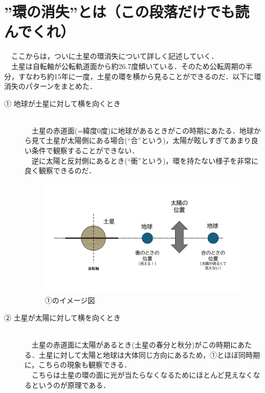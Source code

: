 \documentclass[../main]{subfiles}
\begin{document}
\newpage

\section{”環の消失”とは（この段落だけでも読んでくれ）}
　ここからは，ついに土星の環消失について詳しく記述していく．\\
　土星は自転軸が公転軌道面から約26.7度傾いている．そのため公転周期の半分，すなわち約15年に一度，土星の環を横から見ることができるのだ．以下に環消失のパターンをまとめた．


\begin{description}
    \item[① 地球が土星に対して横を向くとき]\mbox{}\\
    　土星の赤道面(=緯度0度)に地球があるときがこの時期にあたる．地球から見て土星が太陽側にある場合(``合''という)，太陽が眩しすぎてあまり良い条件で観察することができない．\\
　逆に太陽と反対側にあるとき(``衝''という)，環を持たない様子を非常に良く観察できるのだ．
\begin{figure}[H]
    \centering
    \includegraphics[width=14cm]{sections/kurahara/部誌用/スライド1.JPG}
    \caption{①のイメージ図}
\end{figure}


    \item [② 土星が太陽に対して横を向くとき]\mbox{}\\
    　土星の赤道面に太陽があるとき(土星の春分と秋分)がこの時期にあたる．土星に対して太陽と地球は大体同じ方向にあるため，①とほぼ同時期に，こちらの現象も観察できる．\\
　こちらは土星の環の面に光が当たらなくなるためにほとんど見えなくなるというのが原理である．


\end{description}
\end{document}
